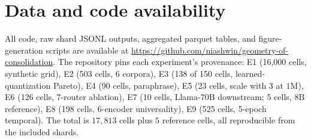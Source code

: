 \section{Data and code availability}
\label{sec:data}

All code, raw shard JSONL outputs, aggregated parquet tables, and
figure-generation scripts are available at
\url{https://github.com/niashwin/geometry-of-consolidation}. The
repository pins each experiment's provenance: E1 (16{,}000 cells,
synthetic grid), E2 (503 cells, 6 corpora), E3 (138 of 150 cells,
learned-quantization Pareto), E4 (90 cells, paraphrase), E5 (23 cells,
scale with 3 at $1$M), E6 (126 cells, 7-router ablation), E7 (10
cells, Llama-70B downstream; 5 cells, 8B reference), E8 (198 cells,
6-encoder universality), E9 (525 cells, 5-epoch temporal). The total
is $17{,}813$ cells plus $5$ reference cells, all reproducible from
the included shards.
